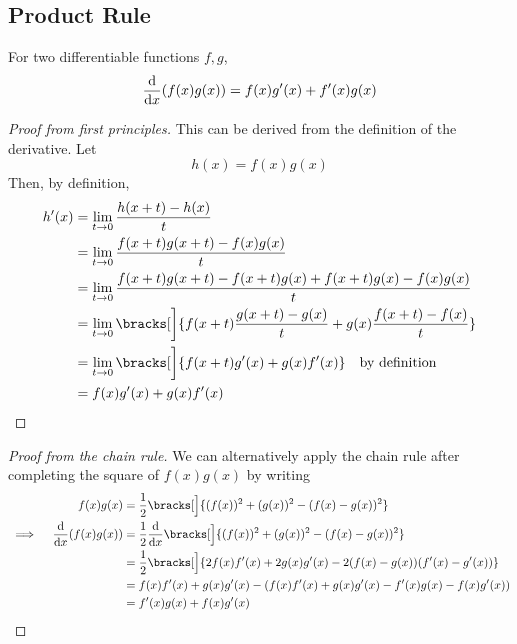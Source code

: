 \subsection{Product Rule} \label{sec_calc_product}

\begin{theorem}
 For two differentiable functions \(f, g\),
 \begin{equation*}
  \dv{x} (f(x)g(x)) = f(x)g'(x) + f'(x)g(x)
 \end{equation*}
\end{theorem}
\begin{proof}[Proof from first principles]
 This can be derived from the definition of the derivative. Let
 \begin{equation*}
  h(x) = f(x)g(x)
 \end{equation*}
 Then, by definition,
 \begin{align*}
  h'(x) &= \lim_{t \to 0} \frac{h(x + t) - h(x)} t \\
        &= \lim_{t \to 0} \frac{f(x + t)g(x + t) - f(x)g(x)} t \\
        &= \lim_{t \to 0} \frac{f(x + t)g(x + t) - f(x + t)g(x)
                              + f(x + t)g(x) - f(x)g(x)} t \\
        &= \lim_{t \to 0} \bracks[\bigg]{
            f(x + t) \frac{g(x + t) - g(x)} t
          + g(x) \frac{f(x + t) - f(x)} t} \\
        &= \lim_{t \to 0} \bracks[\bigg]{
            f(x + t)g'(x)
          + g(x) f'(x)} \quad \text{by definition} \\
        &= f(x)g'(x) + g(x)f'(x)
  \qedhere
 \end{align*}
\end{proof}
\begin{proof}[Proof from the chain rule]
 We can alternatively apply the chain rule after completing the square of
 \(f(x)g(x)\) by writing
 \begin{alignat*}{2}
  && f(x)g(x) &= \frac 12 \bracks[\Big]
                  {(f(x))^2 + (g(x))^2 - (f(x) - g(x))^2} \\
  &\implies{}& \dv{x} (f(x)g(x))
              &= \frac 12 \dv{x} \bracks[\Big]
                  {(f(x))^2 + (g(x))^2 - (f(x) - g(x))^2} \\
  &&          &= \frac 12 \bracks[\Big]
                  {2f(x)f'(x) + 2g(x)g'(x)
                 - 2(f(x) - g(x))(f'(x) - g'(x))} \\
  &&          &= f(x)f'(x) + g(x)g'(x)
               - (f(x)f'(x) + g(x)g'(x) - f'(x)g(x) - f(x)g'(x)) \\
  &&          &= f'(x)g(x) + f(x)g'(x) \qedhere
 \end{alignat*}
\end{proof}

